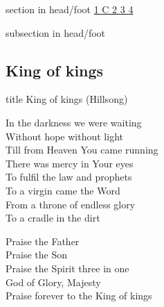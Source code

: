 \documentclass[aspectratio=169]{beamer}
\begin{document}
{
{ 
 {
 \begin{beamercolorbox}[ht=4.5ex,dp=1.5ex,%
      leftskip=.3cm,rightskip=.3cm plus1fil]{section in head/foot}
 \fontsize{12}{25}\selectfont 
\hyperlink{King of kings[](Hillsong)1}{1  }\hyperlink{King of kings[](Hillsong)C}{C  }\hyperlink{King of kings[](Hillsong)2}{2  }\hyperlink{King of kings[](Hillsong)3}{3  }\hyperlink{King of kings[](Hillsong)4}{4  } 
 \end{beamercolorbox}%
  \begin{beamercolorbox}[ht=2.5ex,dp=1.125ex,%
   leftskip=.3cm,rightskip=.3cm plus1fil]{subsection in head/foot}
   \insertauthor
 \end{beamercolorbox}%
 }
}
\subsection{King of kings}
\hypertarget{King of kings[](Hillsong)}{}
\begin{frame}{}
 \vfill
  \centering
  \begin{beamercolorbox}[sep=8pt,center,shadow=true,rounded=true]{title}
    King of kings (Hillsong)    
  \end{beamercolorbox}
  \vfill
\end{frame}

\hypertarget{King of kings[](Hillsong)1}{}
\begin{frame}{}
\fontsize{18.75}{22.5}\selectfont

In the darkness we were waiting\\ 
Without hope without light\\ 
Till from Heaven You came running\\ 
There was mercy in Your eyes\\ 
To fulfil the law and prophets\\ 
To a virgin came the Word\\ 
From a throne of endless glory\\ 
To a cradle in the dirt

\end{frame}
\hypertarget{King of kings[](Hillsong)C}{}
\begin{frame}{}
\fontsize{18.75}{22.5}\selectfont

Praise the Father\\ 
Praise the Son\\ 
Praise the Spirit three in one\\ 
God of Glory, Majesty\\ 
Praise forever to the King of kings


\end{frame}}
\end{document}
